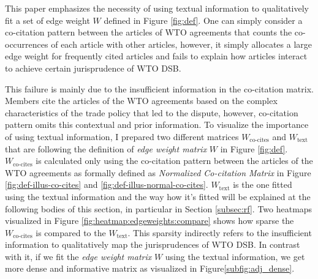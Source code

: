 This paper emphasizes the necessity of using textual information
to qualitatively fit a set of edge weight $W$ defined in Figure \ref{fig:def}. %
One can simply consider a co-citation pattern between the articles of WTO agreements that counts the co-occurrences of each article with other articles, however,
it simply allocates a large edge weight for frequently cited articles and fails to explain how articles interact to achieve certain jurisprudence of WTO DSB. %
 
This failure is mainly due to the insufficient information in the co-citation matrix. Members cite the articles of
the WTO agreements based on the complex characteristics of
the trade policy that led to the dispute, however, co-citation pattern omits this contextual and prior information. To visualize the importance of using textual information, I prepared two different matrices $W_{\text{co-cites}}$ and $W_{\text{text}}$ that are following the definition of \textit{edge weight matrix} $W$ in Figure \ref{fig:def}.
$W_{\text{co-cites}}$ is calculated only using the co-citation pattern between the articles of the WTO agreements as formally defined as \textit{Normalized Co-citation Matrix} in Figure \ref{fig:def-illus-co-cites} and \ref{fig:def-illus-normal-co-cites}.
$W_{\text{text}}$ is the one fitted using the textual information and the way how it's fitted will be explained at the following bodies of this section, in particular in Section \ref{subsec:rf}.
Two heatmaps visualized in Figure \ref{fig:heatmap:edgeweights:compare} shows how sparse the $W_{\text{co-cites}}$ is compared to the $W_{\text{text}}$. This sparsity indirectly refers to the insufficient information
to qualitatively map the jurisprudences of WTO DSB.
In contrast with it, if we fit the \textit{edge weight matrix} $W$ using the textual information, we get more dense and informative matrix as visualized in Figure\ref{subfig:adj_dense}.
 
 


 
